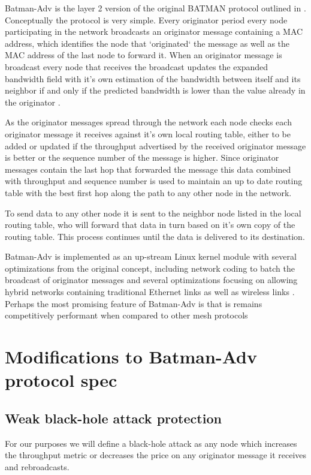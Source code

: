 \documentclass[11pt]{article}
\begin{document}
    Batman-Adv is the layer 2 version of the original BATMAN protocol outlined in \cite{batman}. Conceptually the protocol is very simple. Every originator period every node participating in the network broadcasts an originator message containing a MAC address, which identifies the node that `originated` the message as well as the MAC address of the last node to forward it.  When an originator message is broadcast every node that receives the broadcast updates the expanded bandwidth field with it's own estimation of the bandwidth between itself and its neighbor if and only if the predicted bandwidth is lower than the value already in the originator \cite{batroam}.
    
    As the originator messages spread through the network each node checks each originator message it receives against it's own local routing table, either to be added or updated if the throughput advertised by the received originator message is better or the sequence number of the message is higher. Since originator messages contain the last hop that forwarded the message this data combined with throughput and sequence number is used to maintain an up to date routing table with the best first hop along the path to any other node in the network.
    
    To send data to any other node it is sent to the neighbor node listed in the local routing table, who will forward that data in turn based on it's own copy of the routing table. This process continues until the data is delivered to its destination.
    
    Batman-Adv is implemented as an up-stream Linux kernel module with several optimizations from the original concept, including network coding to batch the broadcast of originator messages and several optimizations focusing on allowing hybrid networks containing traditional Ethernet links as well as wireless links \cite{catwoman}. Perhaps the most promising feature of Batman-Adv is that is remains competitively performant when compared to other mesh protocols \cite{meshperf}


\section{Modifications to Batman-Adv protocol spec}

    \subsection{Weak black-hole attack protection} \label{blackhole}
    			For our purposes we will define a black-hole attack as any node which increases the throughput metric or decreases the price on any originator message it receives and rebroadcasts.
\end{document}
